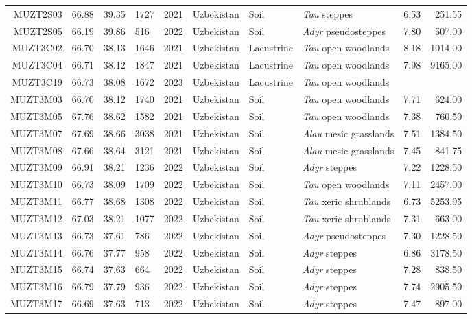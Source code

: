 \begin{table}[ht]
\begin{tabular}{rrrlrlllrr}
  MUZT2S03 & 66.88 & 39.35 & 1727 & 2021 & Uzbekistan & Soil & \textit{Tau} steppes & 6.53 & 251.55 \\ 
  MUZT2S05 & 66.19 & 39.86 & 516 & 2022 & Uzbekistan & Soil & \textit{Adyr} pseudosteppes & 7.80 & 507.00 \\ 
  MUZT3C02 & 66.70 & 38.13 & 1646 & 2021 & Uzbekistan & Lacustrine & \textit{Tau} open woodlands & 8.18 & 1014.00 \\ 
  MUZT3C04 & 66.71 & 38.12 & 1847 & 2021 & Uzbekistan & Lacustrine & \textit{Tau} open woodlands & 7.98 & 9165.00 \\ 
  MUZT3C19 & 66.73 & 38.08 & 1672 & 2023 & Uzbekistan & Lacustrine & \textit{Tau} open woodlands &  &  \\ 
  MUZT3M03 & 66.70 & 38.12 & 1740 & 2021 & Uzbekistan & Soil & \textit{Tau} open woodlands & 7.71 & 624.00 \\ 
  MUZT3M05 & 67.76 & 38.62 & 1582 & 2021 & Uzbekistan & Soil & \textit{Tau} open woodlands & 7.38 & 760.50 \\ 
  MUZT3M07 & 67.69 & 38.66 & 3038 & 2021 & Uzbekistan & Soil & \textit{Alau} mesic grasslands & 7.51 & 1384.50 \\ 
  MUZT3M08 & 67.66 & 38.64 & 3121 & 2021 & Uzbekistan & Soil & \textit{Alau} mesic grasslands & 7.45 & 841.75 \\ 
  MUZT3M09 & 66.91 & 38.21 & 1236 & 2022 & Uzbekistan & Soil & \textit{Adyr} steppes & 7.22 & 1228.50 \\ 
  MUZT3M10 & 66.73 & 38.09 & 1709 & 2022 & Uzbekistan & Soil & \textit{Tau} open woodlands & 7.11 & 2457.00 \\ 
  MUZT3M11 & 66.77 & 38.68 & 1308 & 2022 & Uzbekistan & Soil & \textit{Tau} xeric shrublands & 6.73 & 5253.95 \\ 
  MUZT3M12 & 67.03 & 38.21 & 1077 & 2022 & Uzbekistan & Soil & \textit{Tau} xeric shrublands & 7.31 & 663.00 \\ 
  MUZT3M13 & 66.73 & 37.61 & 786 & 2022 & Uzbekistan & Soil & \textit{Adyr} pseudosteppes & 7.30 & 1228.50 \\ 
  MUZT3M14 & 66.76 & 37.77 & 958 & 2022 & Uzbekistan & Soil & \textit{Adyr} steppes & 6.86 & 3178.50 \\ 
  MUZT3M15 & 66.74 & 37.63 & 664 & 2022 & Uzbekistan & Soil & \textit{Adyr} steppes & 7.28 & 838.50 \\ 
  MUZT3M16 & 66.79 & 37.79 & 936 & 2022 & Uzbekistan & Soil & \textit{Adyr} steppes & 7.74 & 2905.50 \\ 
  MUZT3M17 & 66.69 & 37.63 & 713 & 2022 & Uzbekistan & Soil & \textit{Adyr} steppes & 7.47 & 897.00 \\ 

\end{tabular}
\end{table}

